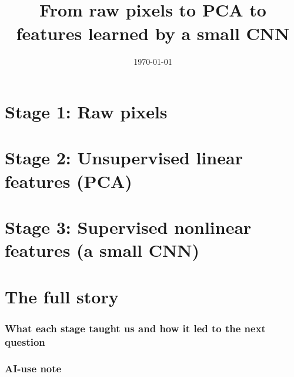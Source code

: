 \documentclass[11pt]{article}
\title{\projecttitle\\\large From raw pixels to PCA to features learned by a small CNN}
\author{\projectauthor}
\date{\today}
\begin{document}
\maketitle
\tableofcontents
\clearpage

\part{Stage 1: Raw pixels}

\clearpage

\part{Stage 2: Unsupervised linear features (PCA)}

\clearpage

\part{Stage 3: Supervised nonlinear features (a small CNN)}

\clearpage

\part{The full story}

\section{What each stage taught us and how it led to the next question}

\section{AI-use note}
\end{document}
